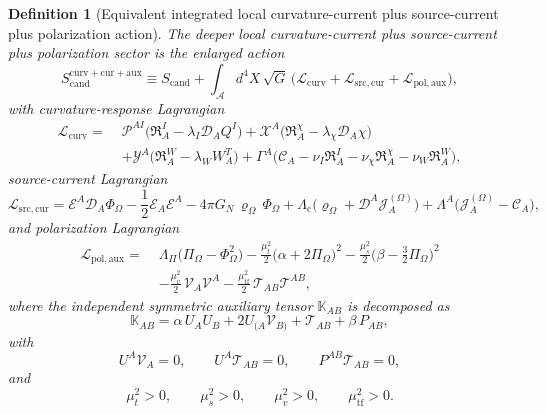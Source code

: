 \documentclass[11pt]{article}
\newcommand{\Sub}{\mathcal{A}}
\newcommand{\ProjSub}{P}
\newcommand{\SpatialD}{\mathcal D}
\newcommand{\FlowPot}{\Phi_\Omega}
\newcommand{\BalanceField}{\Pi_\Omega}
\newcommand{\BalMult}{\Lambda_\Pi}
\newcommand{\SourceDensity}{\varrho_\Omega}
\newcommand{\SourceCurrent}{\mathcal J^{(\Omega)}}
\newcommand{\ConstCurrent}{\mathcal C}
\newcommand{\ContMult}{\Lambda_{\mathrm c}}
\newcommand{\CurrentMult}{\Lambda}
\newcommand{\ConstGamma}{\Gamma}
\newcommand{\CurvQMult}{\mathscr P}
\newcommand{\CurvChiMult}{\mathscr X}
\newcommand{\CurvTransMult}{\mathscr Y}
\newcommand{\SourceFlux}{\mathcal E}
\newcommand{\AuxPol}{\mathbb K}
\newcommand{\CandAction}{S_{\mathrm{cand}}}
\newcommand{\CurvAction}{S_{\mathrm{cand}}^{\mathrm{curv+cur+aux}}}
\newtheorem{definition}{Definition}
\begin{document}
\begin{definition}[Equivalent integrated local curvature-current plus source-current plus polarization action]
\label{def:action}
The \emph{deeper local curvature-current plus source-current plus polarization sector} is the enlarged action
\begin{equation}
\CurvAction
\equiv
\CandAction
+
\int_{\Sub} d^4X\,\sqrt{G}\,
\bigl(
\mathcal L_{\mathrm{curv}}
+\mathcal L_{\mathrm{src,cur}}
+\mathcal L_{\mathrm{pol,aux}}
\bigr),
\label{eq:fullaction}
\end{equation}
with curvature-response Lagrangian
\begin{align}
\mathcal L_{\mathrm{curv}}
=\;&
\CurvQMult^{AI}\bigl(\mathfrak R_A^I-\lambda_I\SpatialD_AQ^I\bigr)
+\CurvChiMult^A\bigl(\mathfrak R_A^\chi-\lambda_\chi\SpatialD_A\chi\bigr)
\nonumber\\
&+\CurvTransMult^A\bigl(\mathfrak R_A^W-\lambda_WW_A^T\bigr)
+\ConstGamma^A\bigl(
\ConstCurrent_A
-\nu_I\mathfrak R_A^I
-\nu_\chi\mathfrak R_A^\chi
-\nu_W\mathfrak R_A^W
\bigr),
\label{eq:lcurv}
\end{align}
source-current Lagrangian
\begin{equation}
\mathcal L_{\mathrm{src,cur}}
=
\SourceFlux^A\SpatialD_A\FlowPot
-\frac12 \SourceFlux_A\SourceFlux^A
-4\pi G_N\,\SourceDensity\,\FlowPot
+\ContMult\bigl(\SourceDensity+\SpatialD^A\SourceCurrent_A\bigr)
+\CurrentMult^A\bigl(\SourceCurrent_A-\ConstCurrent_A\bigr),
\label{eq:lcur}
\end{equation}
and polarization Lagrangian
\begin{align}
\mathcal L_{\mathrm{pol,aux}}
=\;&
\BalMult\bigl(\BalanceField-\FlowPot^2\bigr)
-\frac{\mu_t^2}{2}\bigl(\alpha+2\BalanceField\bigr)^2
-\frac{\mu_s^2}{2}\bigl(\beta-\tfrac32\BalanceField\bigr)^2
\nonumber\\
&-\frac{\mu_v^2}{2}\,\mathcal V_A\mathcal V^A
-\frac{\mu_{\mathrm{tf}}^2}{2}\,\mathcal T_{AB}\mathcal T^{AB},
\label{eq:laux}
\end{align}
where the independent symmetric auxiliary tensor \(\AuxPol_{AB}\) is decomposed as
\begin{equation}
\AuxPol_{AB}
=
\alpha\,U_AU_B
+2U_{(A}\mathcal V_{B)}
+\mathcal T_{AB}
+\beta\,\ProjSub_{AB},
\label{eq:Kdecomp}
\end{equation}
with
\begin{equation}
U^A\mathcal V_A=0,
\qquad
U^A\mathcal T_{AB}=0,
\qquad
\ProjSub^{AB}\mathcal T_{AB}=0,
\label{eq:TVcond}
\end{equation}
and
\begin{equation}
\mu_t^2>0,
\qquad
\mu_s^2>0,
\qquad
\mu_v^2>0,
\qquad
\mu_{\mathrm{tf}}^2>0.
\label{eq:masses}
\end{equation}
\end{definition}
\end{document}
